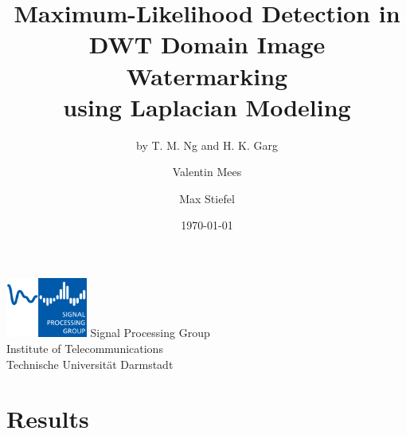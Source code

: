 \documentclass[accentcolor=tud1b,colorbacktitle]{tudbeamer}
\title{Maximum-Likelihood Detection in\\ DWT Domain Image Watermarking\\ using Laplacian Modeling}
\subtitle{by T. M. Ng and H. K. Garg}
\date{\today}
\author[V.Mees \and M.Stiefel]{Valentin Mees \and Max Stiefel}               %
\institute[SPG]{}
\begin{document}
\begin{titleframe}
\centering
\vfill
\textit{\Large \insertauthor}
\vfill
\includegraphics[width=0.2\textwidth]{figures/spg_logo}
\vfill
   Signal Processing Group\\
   Institute of Telecommunications\\
   Technische Universit\"at Darmstadt\\
\end{titleframe}
%


%

%

%

%

\section{Results}


%
\end{document}
